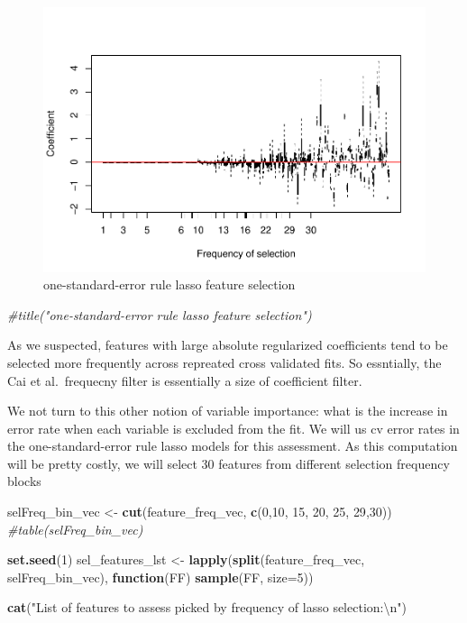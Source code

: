 \documentclass[
]{book}
\newenvironment{Shaded}{\begin{snugshade}}{\end{snugshade}}
\newcommand{\CharTok}[1]{\textcolor[rgb]{0.31,0.60,0.02}{#1}}
\newcommand{\CommentTok}[1]{\textcolor[rgb]{0.56,0.35,0.01}{\textit{#1}}}
\newcommand{\ControlFlowTok}[1]{\textcolor[rgb]{0.13,0.29,0.53}{\textbf{#1}}}
\newcommand{\DataTypeTok}[1]{\textcolor[rgb]{0.13,0.29,0.53}{#1}}
\newcommand{\DecValTok}[1]{\textcolor[rgb]{0.00,0.00,0.81}{#1}}
\newcommand{\KeywordTok}[1]{\textcolor[rgb]{0.13,0.29,0.53}{\textbf{#1}}}
\newcommand{\NormalTok}[1]{#1}
\newcommand{\StringTok}[1]{\textcolor[rgb]{0.31,0.60,0.02}{#1}}
\begin{document}
\begin{figure}
\centering
\includegraphics{Static/figures/varOccurence-1.pdf}
\caption{\label{fig:varOccurence}one-standard-error rule lasso feature selection}
\end{figure}

\begin{Shaded}
\begin{Highlighting}[]
 \CommentTok{\#title("one{-}standard{-}error rule lasso feature selection")}
\end{Highlighting}
\end{Shaded}

As we suspected, features with large absolute regularized coefficients tend to
be selected more frequently across repreated cross validated fits. So essntially,
the Cai et al.~frequecny filter is essentially a size of coefficient filter.

We not turn to this other notion of variable importance: what is the increase in
error rate when each variable is excluded from the fit. We will us cv error rates in
the one-standard-error rule lasso models for this assessment. As this computation
will be pretty costly, we will select 30 features from different
selection frequency blocks

\begin{Shaded}
\begin{Highlighting}[]
\NormalTok{selFreq\_bin\_vec <{-}}\StringTok{ }\KeywordTok{cut}\NormalTok{(feature\_freq\_vec, }\KeywordTok{c}\NormalTok{(}\DecValTok{0}\NormalTok{,}\DecValTok{10}\NormalTok{, }\DecValTok{15}\NormalTok{, }\DecValTok{20}\NormalTok{, }\DecValTok{25}\NormalTok{, }\DecValTok{29}\NormalTok{,}\DecValTok{30}\NormalTok{))}
\CommentTok{\#table(selFreq\_bin\_vec)}

\KeywordTok{set.seed}\NormalTok{(}\DecValTok{1}\NormalTok{)}
\NormalTok{sel\_features\_lst <{-}}\StringTok{ }\KeywordTok{lapply}\NormalTok{(}\KeywordTok{split}\NormalTok{(feature\_freq\_vec, selFreq\_bin\_vec),}
  \ControlFlowTok{function}\NormalTok{(FF) }\KeywordTok{sample}\NormalTok{(FF, }\DataTypeTok{size=}\DecValTok{5}\NormalTok{))}

\KeywordTok{cat}\NormalTok{(}\StringTok{"List of features to assess picked by frequency of lasso selection:}\CharTok{\textbackslash{}n}\StringTok{"}\NormalTok{)}
\end{Highlighting}
\end{Shaded}
\end{document}
